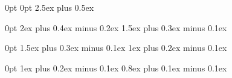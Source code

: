 \usepackage{titlesec}              %

\titlespacing*{\chapter}
{0pt}               %
{0pt}               %
{2.5ex plus 0.5ex}  %

\titlespacing*{\section}
{0pt}               %
{2ex plus 0.4ex minus 0.2ex} %
{1.5ex plus 0.3ex minus 0.1ex} %

\titlespacing*{\subsection}
{0pt}               %
{1.5ex plus 0.3ex minus 0.1ex} %
{1ex plus 0.2ex minus 0.1ex}   %

\titlespacing*{\subsubsection}
{0pt}               %
{1ex plus 0.2ex minus 0.1ex}   %
{0.8ex plus 0.1ex minus 0.1ex} %
